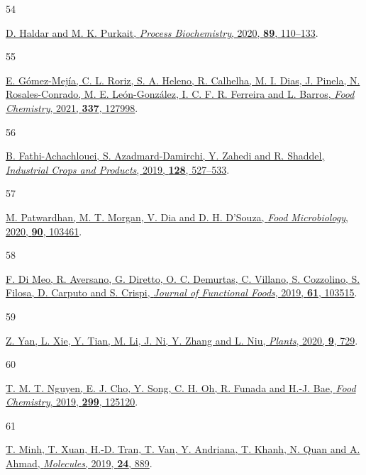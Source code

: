 \documentclass[
  letterpaper,
  DIV=11,
  numbers=noendperiod]{scrartcl}
\newlength{\cslhangindent}
\newlength{\csllabelwidth}
\newenvironment{CSLReferences}[2] %
 {\begin{list}{}{%
  \setlength{\itemindent}{0pt}
  \setlength{\leftmargin}{0pt}
  \setlength{\parsep}{0pt}
  \ifodd #1
   \setlength{\leftmargin}{\cslhangindent}
   \setlength{\itemindent}{-1\cslhangindent}
  \fi
  \setlength{\itemsep}{#2\baselineskip}}}
 {\end{list}}
\newcommand{\CSLLeftMargin}[1]{\parbox[t]{\csllabelwidth}{\strut#1\strut}}
\newcommand{\CSLRightInline}[1]{\parbox[t]{\linewidth - \csllabelwidth}{\strut#1\strut}}
\begin{document}
\begin{CSLReferences}{0}{0}
\CSLLeftMargin{54 }%
\CSLRightInline{\href{https://doi.org/10.1016/j.procbio.2019.10.001}{D.
Haldar and M. K. Purkait, \emph{Process Biochemistry}, 2020,
\textbf{89}, 110--133}.}

\CSLLeftMargin{55 }%
\CSLRightInline{\href{https://doi.org/10.1016/j.foodchem.2020.127998}{E.
Gómez-Mejía, C. L. Roriz, S. A. Heleno, R. Calhelha, M. I. Dias, J.
Pinela, N. Rosales-Conrado, M. E. León-González, I. C. F. R. Ferreira
and L. Barros, \emph{Food Chemistry}, 2021, \textbf{337}, 127998}.}

\CSLLeftMargin{56 }%
\CSLRightInline{\href{https://doi.org/10.1016/j.indcrop.2018.11.034}{B.
Fathi-Achachlouei, S. Azadmard-Damirchi, Y. Zahedi and R. Shaddel,
\emph{Industrial Crops and Products}, 2019, \textbf{128}, 527--533}.}

\CSLLeftMargin{57 }%
\CSLRightInline{\href{https://doi.org/10.1016/j.fm.2020.103461}{M.
Patwardhan, M. T. Morgan, V. Dia and D. H. D'Souza, \emph{Food
Microbiology}, 2020, \textbf{90}, 103461}.}

\CSLLeftMargin{58 }%
\CSLRightInline{\href{https://doi.org/10.1016/j.jff.2019.103515}{F. Di
Meo, R. Aversano, G. Diretto, O. C. Demurtas, C. Villano, S. Cozzolino,
S. Filosa, D. Carputo and S. Crispi, \emph{Journal of Functional Foods},
2019, \textbf{61}, 103515}.}

\CSLLeftMargin{59 }%
\CSLRightInline{\href{https://doi.org/10.3390/plants9060729}{Z. Yan, L.
Xie, Y. Tian, M. Li, J. Ni, Y. Zhang and L. Niu, \emph{Plants}, 2020,
\textbf{9}, 729}.}

\CSLLeftMargin{60 }%
\CSLRightInline{\href{https://doi.org/10.1016/j.foodchem.2019.125120}{T.
M. T. Nguyen, E. J. Cho, Y. Song, C. H. Oh, R. Funada and H.-J. Bae,
\emph{Food Chemistry}, 2019, \textbf{299}, 125120}.}

\CSLLeftMargin{61 }%
\CSLRightInline{\href{https://doi.org/10.3390/molecules24050889}{T.
Minh, T. Xuan, H.-D. Tran, T. Van, Y. Andriana, T. Khanh, N. Quan and A.
Ahmad, \emph{Molecules}, 2019, \textbf{24}, 889}.}


\end{CSLReferences}
\end{document}
